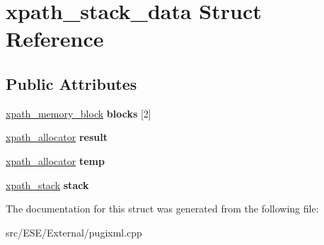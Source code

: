 \hypertarget{structxpath__stack__data}{\section{xpath\-\_\-stack\-\_\-data Struct Reference}
\label{structxpath__stack__data}
}
\subsection*{Public Attributes}
\begin{DoxyCompactItemize}
\item 
\hypertarget{structxpath__stack__data_a6821cc444dd65d997467fd3f757f4aff}{\hyperlink{structxpath__memory__block}{xpath\-\_\-memory\-\_\-block} {\bfseries blocks} \mbox{[}2\mbox{]}}\label{structxpath__stack__data_a6821cc444dd65d997467fd3f757f4aff}

\item 
\hypertarget{structxpath__stack__data_ab073a685c66383ded44076993afe62d6}{\hyperlink{classxpath__allocator}{xpath\-\_\-allocator} {\bfseries result}}\label{structxpath__stack__data_ab073a685c66383ded44076993afe62d6}

\item 
\hypertarget{structxpath__stack__data_a56e6bb486d52f4c5c2d02370e1b41058}{\hyperlink{classxpath__allocator}{xpath\-\_\-allocator} {\bfseries temp}}\label{structxpath__stack__data_a56e6bb486d52f4c5c2d02370e1b41058}

\item 
\hypertarget{structxpath__stack__data_ad26a92328f9aaf83fa62cb6695dbee90}{\hyperlink{structxpath__stack}{xpath\-\_\-stack} {\bfseries stack}}\label{structxpath__stack__data_ad26a92328f9aaf83fa62cb6695dbee90}

\end{DoxyCompactItemize}


The documentation for this struct was generated from the following file\-:\begin{DoxyCompactItemize}
\item 
src/\-E\-S\-E/\-External/pugixml.\-cpp\end{DoxyCompactItemize}
